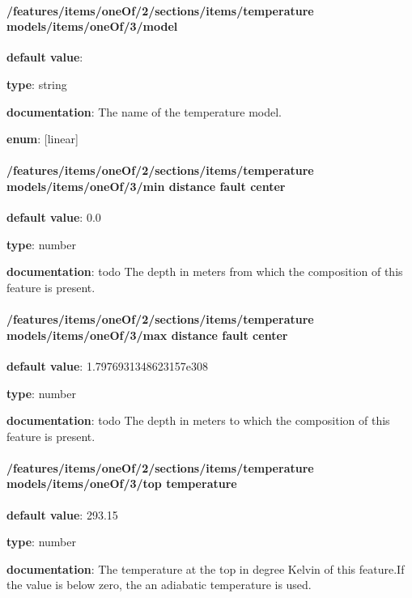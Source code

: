 \paragraph{/features/items/oneOf/2/sections/items/temperature models/items/oneOf/3/model} \begin{itemized}
\item {\bf default value}: 
\item {\bf type}: string
\item {\bf documentation}: The name of the temperature model.
\item {\bf enum}: [linear]\end{itemized}\paragraph{/features/items/oneOf/2/sections/items/temperature models/items/oneOf/3/min distance fault center} \begin{itemized}
\item {\bf default value}: 0.0
\item {\bf type}: number
\item {\bf documentation}: todo The depth in meters from which the composition of this feature is present.
\end{itemized}\paragraph{/features/items/oneOf/2/sections/items/temperature models/items/oneOf/3/max distance fault center} \begin{itemized}
\item {\bf default value}: 1.7976931348623157e308
\item {\bf type}: number
\item {\bf documentation}: todo The depth in meters to which the composition of this feature is present.
\end{itemized}\paragraph{/features/items/oneOf/2/sections/items/temperature models/items/oneOf/3/top temperature} \begin{itemized}
\item {\bf default value}: 293.15
\item {\bf type}: number
\item {\bf documentation}: The temperature at the top in degree Kelvin of this feature.If the value is below zero, the an adiabatic temperature is used.

\end{itemized}
